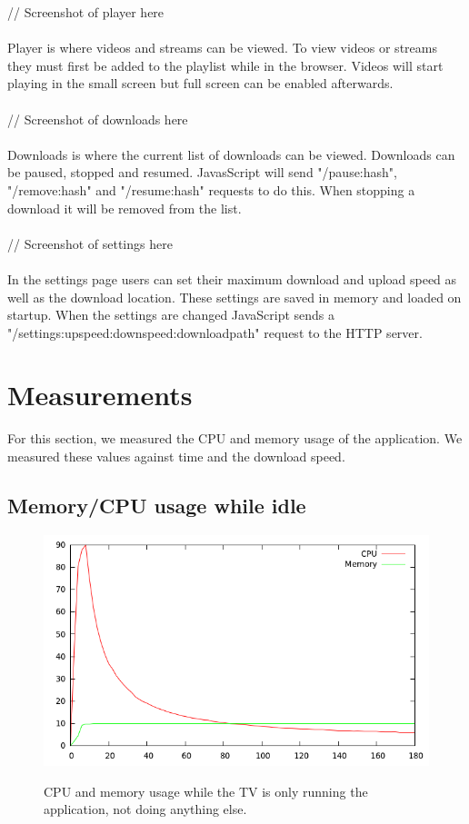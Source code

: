 // Screenshot of player here 
\\\\
Player is where videos and streams can be viewed. To view videos or streams they must first be added to the playlist while in the browser. Videos will start playing in the small screen but full screen can be enabled afterwards.
\\\\
// Screenshot of downloads here 
\\\\
Downloads is where the current list of downloads can be viewed. Downloads can be paused, stopped and resumed. JavasScript will send "/pause:hash", "/remove:hash" and "/resume:hash" requests to do this. When stopping a download it will be removed from the list. 
\\\\
// Screenshot of settings here 
\\\\
In the settings page users can set their maximum download and upload speed as well as the download location. These settings are saved in memory and loaded on startup. When the settings are changed JavaScript sends a "/settings:upspeed:downspeed:downloadpath" request to the HTTP server.


\section{Measurements}
For this section, we measured the CPU and memory usage of the application. We measured these values against time and the download speed.

\newpage
\subsection{Memory/CPU usage while idle}

\begin{center}
\begin{figure}[h]
	\centering
	\mbox{\includegraphics[width=1.2\textwidth]{Images/idle.png}}
	\label{graph:idle}
	\caption{CPU and memory usage while the TV is only running the application, not doing anything else.}
\end{figure}
\end{center}
